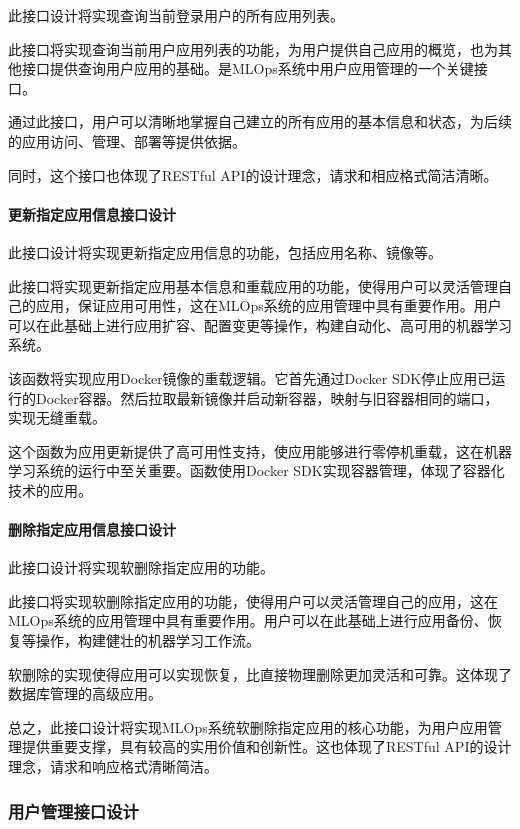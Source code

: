 \documentclass{HDU-Bachelor-Thesis}
\begin{document}
此接口设计将实现查询当前登录用户的所有应用列表。

此接口将实现查询当前用户应用列表的功能，为用户提供自己应用的概览，也为其他接口提供查询用户应用的基础。是MLOps系统中用户应用管理的一个关键接口。

通过此接口，用户可以清晰地掌握自己建立的所有应用的基本信息和状态，为后续的应用访问、管理、部署等提供依据。

同时，这个接口也体现了RESTful API的设计理念，请求和相应格式简洁清晰。

\paragraph{更新指定应用信息接口设计}

此接口设计将实现更新指定应用信息的功能，包括应用名称、镜像等。

此接口将实现更新指定应用基本信息和重载应用的功能，使得用户可以灵活管理自己的应用，保证应用可用性，这在MLOps系统的应用管理中具有重要作用。用户可以在此基础上进行应用扩容、配置变更等操作，构建自动化、高可用的机器学习系统。

该函数将实现应用Docker镜像的重载逻辑。它首先通过Docker SDK停止应用已运行的Docker容器。然后拉取最新镜像并启动新容器，映射与旧容器相同的端口，实现无缝重载。

这个函数为应用更新提供了高可用性支持，使应用能够进行零停机重载，这在机器学习系统的运行中至关重要。函数使用Docker SDK实现容器管理，体现了容器化技术的应用。

\paragraph{删除指定应用信息接口设计}

此接口设计将实现软删除指定应用的功能。

此接口将实现软删除指定应用的功能，使得用户可以灵活管理自己的应用，这在MLOps系统的应用管理中具有重要作用。用户可以在此基础上进行应用备份、恢复等操作，构建健壮的机器学习工作流。

软删除的实现使得应用可以实现恢复，比直接物理删除更加灵活和可靠。这体现了数据库管理的高级应用。

总之，此接口设计将实现MLOps系统软删除指定应用的核心功能，为用户应用管理提供重要支撑，具有较高的实用价值和创新性。这也体现了RESTful API的设计理念，请求和响应格式清晰简洁。

\subsubsection{用户管理接口设计}
\end{document}
